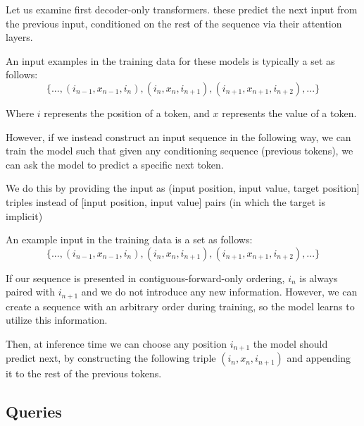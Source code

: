 Let us examine first decoder-only transformers. these predict the next input from the previous input, conditioned on the rest of the sequence via their attention layers.

An input examples in the training data for these models is typically a set as follows:
$$
   \{ ..., (i_{n-1}, x_{n-1}, i_{n}), (i_{n}, x_{n}, i_{n+1}), (i_{n+1}, x_{n+1}, i_{n+2}), ... \}
$$

Where $i$ represents the position of a token, and $x$ represents the value of a token.

However, if we instead construct an input sequence in the following way, we can train the model such that given any conditioning sequence (previous tokens), we can ask the model to predict a specific next token.

We do this by providing the input as (input position, input value, target position] triples instead of [input position, input value] pairs (in which the target is implicit)



An example input in the training data is a set as follows:
$$
   \{ ..., (i_{n-1}, x_{n-1}, i_{n}), (i_{n}, x_{n}, i_{n+1}), (i_{n+1}, x_{n+1}, i_{n+2}), ... \}
$$


If our sequence is presented in contiguous-forward-only ordering, $i_n$ is always paired with $i_{n+1}$ and we do not introduce any new information. However, we can create a sequence with an arbitrary order during training, so the model learns to utilize this information.

Then, at inference time we can choose any position $i_{n+1}$ the model should predict next, by constructing the following triple $(i_n, x_n, i_{n+1})$ and appending it to the rest of the previous tokens.

\subsection{Queries}
\label{ss:cross-attn-queries}


